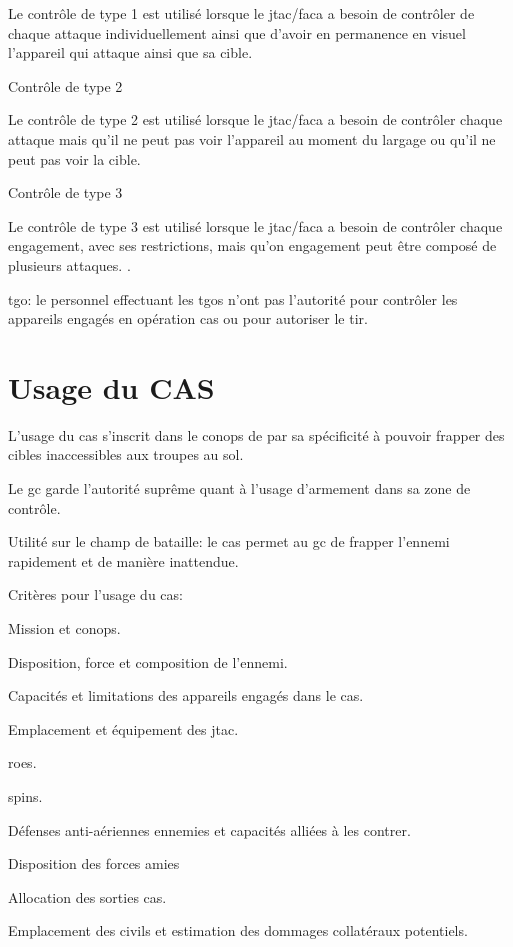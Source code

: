         Le contrôle de type 1 est utilisé lorsque le \gls{jtac}/\gls{faca} a besoin de contrôler de chaque attaque individuellement ainsi que d'avoir en permanence en visuel l'appareil qui attaque ainsi que sa cible.
        \item
        Contrôle de type 2

        Le contrôle de type 2 est utilisé lorsque le \gls{jtac}/\gls{faca} a besoin de contrôler chaque attaque mais qu'il ne peut pas voir l'appareil au moment du largage ou qu'il ne peut pas voir la cible.
        \item
        Contrôle de type 3

        Le contrôle de type 3 est utilisé lorsque le \gls{jtac}/\gls{faca} a besoin de contrôler chaque engagement, avec ses restrictions, mais qu'on engagement peut être composé de plusieurs attaques.
    \ed
    .
    \item \gls{tgo}: le personnel effectuant les \glspl{tgo} n'ont pas l'autorité pour contrôler les appareils engagés en opération \gls{cas} ou pour autoriser le tir.
\ed
    
\section{Usage du CAS}

\e
	\item
	L'usage du \gls{cas} s'inscrit dans le \gls{conops} de par sa spécificité à pouvoir frapper des cibles inaccessibles aux troupes au sol.
	
	\item
	Le \gls{gc} garde l'autorité suprême quant à l'usage d'armement dans sa zone de contrôle.
	
	\item
	Utilité sur le champ de bataille: le \gls{cas} permet au \gls{gc} de frapper l'ennemi rapidement et de manière inattendue.
	
	\item Critères pour l'usage du \gls{cas}:
	
	\ee
		\item Mission et \gls{conops}.
		\item Disposition, force et composition de l'ennemi.
		\item Capacités et limitations des appareils engagés dans le \gls{cas}.
		\item Emplacement et équipement des \gls{jtac}.
		\item \glspl{roe}.
		\item \gls{spins}.
		\item Défenses anti-aériennes ennemies et capacités alliées à les contrer.
		\item Disposition des forces amies
		\item Allocation des sorties \gls{cas}.
		\item Emplacement des civils et estimation des dommages collatéraux potentiels.	
	\ed
	
